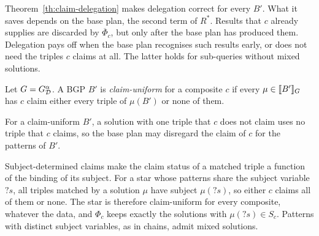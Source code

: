 Theorem~\ref{th:claim-delegation} makes delegation correct for every $B'$. What it saves
depends on the base plan, the second term of $R^{*}$. Results that $c$ already supplies
are discarded by $\overline{\Phi}_c$, but only after the base plan has produced them.
Delegation pays off when the base plan recognises such results early, or does not need the
triples $c$ claims at all. The latter holds for sub-queries without mixed solutions.

\begin{definition}
\label{def:uniform}
Let $G = G^{\alpha}_{\mathcal{D}}$. A BGP $B'$ is \emph{claim-uniform} for a composite $c$ if
every $\mu \in \llbracket B' \rrbracket_{G}$ has $c$ claim either every triple of $\mu(B')$ or none of
them.
\end{definition}

For a claim-uniform $B'$, a solution with one triple that $c$ does not claim uses no
triple that $c$ claims, so the base plan may disregard the claim of $c$ for the patterns
of $B'$.

Subject-determined claims make the claim status of a matched triple a function of the
binding of its subject. For a star whose patterns share the subject variable $?s$, all
triples matched by a solution $\mu$ have subject $\mu(?s)$, so either $c$ claims all of
them or none. The star is therefore claim-uniform for every composite, whatever the data,
and $\Phi_c$ keeps exactly the solutions with $\mu(?s) \in S_c$. Patterns with distinct
subject variables, as in chains, admit mixed solutions.

